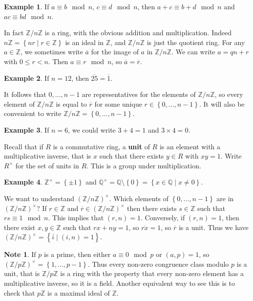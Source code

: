 \documentclass{article}
\newcommand{\Z}{\mathbb{Z}}
\newcommand{\Q}{\mathbb{Q}}
\newcommand{\rb}[1]{\left( #1 \right)}
\newcommand{\cb}[1]{\left\{ #1 \right\}}
\newcommand{\unit}[1]{\rb{\Z / #1\Z}^\times}
\theoremstyle{definition}\newtheorem{definition}{Definition}
\theoremstyle{definition}\newtheorem{remark}[definition]{Remark}
\theoremstyle{definition}\newtheorem*{example}{Example}
\theoremstyle{definition}\newtheorem*{note}{Note}
\begin{document}
\begin{example}
If $ a \equiv b \mod n $, $ c \equiv d \mod n $, then $ a + c \equiv b + d \mod n $ and $ ac \equiv bd \mod n $.
\end{example}

In fact $ \Z / n\Z $ is a ring, with the obvious addition and multiplication. Indeed $ n\Z = \cb{nr \mid r \in \Z} $ is an ideal in $ \Z $, and $ \Z / n\Z $ is just the quotient ring. For any $ a \in \Z $, we sometimes write $ \overline{a} $ for the image of $ a $ in $ \Z / n\Z $. We can write $ a = qn + r $ with $ 0 \le r < n $. Then $ a \equiv r \mod n $, so $ \overline{a} = \overline{r} $.

\begin{example}
If $ n = 12 $, then $ \overline{25} = \overline{1} $.
\end{example}

It follows that $ 0, \dots, n - 1 $ are representatives for the elements of $ \Z / n\Z $, so every element of $ \Z / n\Z $ is equal to $ \overline{r} $ for some unique $ r \in \cb{0, \dots, n - 1} $. It will also be convenient to write $ \Z / n\Z = \cb{0, \dots, n - 1} $.

\begin{example}
If $ n = 6 $, we could write $ 3 + 4 = 1 $ and $ 3 \times 4 = 0 $.
\end{example}

Recall that if $ R $ is a commutative ring, a \textbf{unit} of $ R $ is an element with a multiplicative inverse, that is $ x $ such that there exists $ y \in R $ with $ xy = 1 $. Write $ R^\times $ for the set of units in $ R $. This is a group under multiplication.

\begin{example}
$ \Z^\times = \cb{\pm 1} $ and $ \Q^\times = \Q \setminus \cb{0} = \cb{x \in \Q \mid x \ne 0} $.
\end{example}

We want to understand $ \unit{n} $. Which elements of $ \cb{0, \dots, n - 1} $ are in $ \unit{n} $? If $ r \in \Z $ and $ \overline{r} \in \unit{n} $ then there exists $ s \in \Z $ such that $ rs \equiv 1 \mod n $. This implies that $ \rb{r, n} = 1 $. Conversely, if $ \rb{r, n} = 1 $, then there exist $ x, y \in \Z $ such that $ rx + ny = 1 $, so $ \overline{rx} = 1 $, so $ \overline{r} $ is a unit. Thus we have $ \unit{n} = \cb{\overline{i} \mid \rb{i, n} = 1} $.

\begin{note}
If $ p $ is a prime, then either $ a \equiv 0 \mod p $ or $ \rb{a, p} = 1 $, so $ \unit{p} = \cb{1, \dots, p - 1} $. Thus every non-zero congruence class modulo $ p $ is a unit, that is $ \Z / p\Z $ is a ring with the property that every non-zero element has a multiplicative inverse, so it is a field. Another equivalent way to see this is to check that $ p\Z $ is a maximal ideal of $ \Z $.
\end{note}
\end{document}
